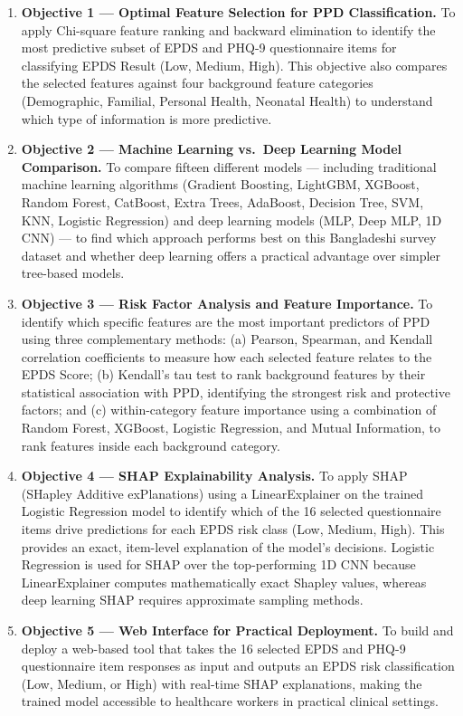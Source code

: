 \begin{enumerate}

\item \textbf{Objective 1 --- Optimal Feature Selection for PPD Classification.}
To apply Chi-square feature ranking and backward elimination to identify the most predictive subset of EPDS and PHQ-9 questionnaire items for classifying EPDS Result (Low, Medium, High). This objective also compares the selected features against four background feature categories (Demographic, Familial, Personal Health, Neonatal Health) to understand which type of information is more predictive.

\item \textbf{Objective 2 --- Machine Learning vs.\ Deep Learning Model Comparison.}
To compare fifteen different models --- including traditional machine learning algorithms (Gradient Boosting, LightGBM, XGBoost, Random Forest, CatBoost, Extra Trees, AdaBoost, Decision Tree, SVM, KNN, Logistic Regression) and deep learning models (MLP, Deep MLP, 1D CNN) --- to find which approach performs best on this Bangladeshi survey dataset and whether deep learning offers a practical advantage over simpler tree-based models.

\item \textbf{Objective 3 --- Risk Factor Analysis and Feature Importance.}
To identify which specific features are the most important predictors of PPD using three complementary methods: (a) Pearson, Spearman, and Kendall correlation coefficients to measure how each selected feature relates to the EPDS Score; (b) Kendall's tau test to rank background features by their statistical association with PPD, identifying the strongest risk and protective factors; and (c) within-category feature importance using a combination of Random Forest, XGBoost, Logistic Regression, and Mutual Information, to rank features inside each background category.

\item \textbf{Objective 4 --- SHAP Explainability Analysis.}
To apply SHAP (SHapley Additive exPlanations) using a LinearExplainer on the trained Logistic Regression model to identify which of the 16 selected questionnaire items drive predictions for each EPDS risk class (Low, Medium, High). This provides an exact, item-level explanation of the model's decisions. Logistic Regression is used for SHAP over the top-performing 1D CNN because LinearExplainer computes mathematically exact Shapley values, whereas deep learning SHAP requires approximate sampling methods.

\item \textbf{Objective 5 --- Web Interface for Practical Deployment.}
To build and deploy a web-based tool that takes the 16 selected EPDS and PHQ-9 questionnaire item responses as input and outputs an EPDS risk classification (Low, Medium, or High) with real-time SHAP explanations, making the trained model accessible to healthcare workers in practical clinical settings.

\end{enumerate}

